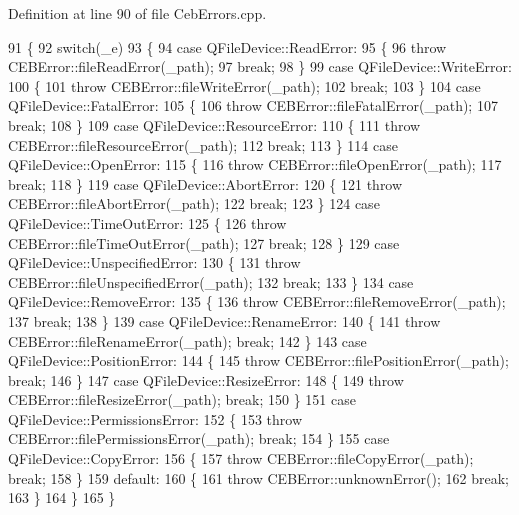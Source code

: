 Definition at line 90 of file Ceb\-Errors.\-cpp.


\begin{DoxyCode}
91 \{
92   \textcolor{keywordflow}{switch}(\_e)
93   \{
94     \textcolor{keywordflow}{case} QFileDevice::ReadError:
95     \{
96       \textcolor{keywordflow}{throw} CEBError::fileReadError(\_path);
97       \textcolor{keywordflow}{break};
98     \}
99     \textcolor{keywordflow}{case} QFileDevice::WriteError:
100     \{
101       \textcolor{keywordflow}{throw} CEBError::fileWriteError(\_path);
102       \textcolor{keywordflow}{break};
103     \}
104     \textcolor{keywordflow}{case} QFileDevice::FatalError:
105     \{
106       \textcolor{keywordflow}{throw} CEBError::fileFatalError(\_path);
107       \textcolor{keywordflow}{break};
108     \}
109     \textcolor{keywordflow}{case} QFileDevice::ResourceError:
110     \{
111       \textcolor{keywordflow}{throw} CEBError::fileResourceError(\_path);
112       \textcolor{keywordflow}{break};
113     \}
114     \textcolor{keywordflow}{case} QFileDevice::OpenError:
115     \{
116       \textcolor{keywordflow}{throw} CEBError::fileOpenError(\_path);
117       \textcolor{keywordflow}{break};
118     \}
119     \textcolor{keywordflow}{case} QFileDevice::AbortError:
120     \{
121       \textcolor{keywordflow}{throw} CEBError::fileAbortError(\_path);
122       \textcolor{keywordflow}{break};
123     \}
124     \textcolor{keywordflow}{case} QFileDevice::TimeOutError:
125     \{
126       \textcolor{keywordflow}{throw} CEBError::fileTimeOutError(\_path);
127       \textcolor{keywordflow}{break};
128     \}
129     \textcolor{keywordflow}{case} QFileDevice::UnspecifiedError:
130     \{
131       \textcolor{keywordflow}{throw} CEBError::fileUnspecifiedError(\_path);
132       \textcolor{keywordflow}{break};
133     \}
134     \textcolor{keywordflow}{case} QFileDevice::RemoveError:
135     \{
136       \textcolor{keywordflow}{throw} CEBError::fileRemoveError(\_path);
137       \textcolor{keywordflow}{break};
138     \}
139     \textcolor{keywordflow}{case} QFileDevice::RenameError:
140     \{
141       \textcolor{keywordflow}{throw} CEBError::fileRenameError(\_path); \textcolor{keywordflow}{break};
142     \}
143     \textcolor{keywordflow}{case} QFileDevice::PositionError:
144     \{
145       \textcolor{keywordflow}{throw} CEBError::filePositionError(\_path); \textcolor{keywordflow}{break};
146     \}
147     \textcolor{keywordflow}{case} QFileDevice::ResizeError:
148     \{
149       \textcolor{keywordflow}{throw} CEBError::fileResizeError(\_path); \textcolor{keywordflow}{break};
150     \}
151     \textcolor{keywordflow}{case} QFileDevice::PermissionsError:
152     \{
153       \textcolor{keywordflow}{throw} CEBError::filePermissionsError(\_path); \textcolor{keywordflow}{break};
154     \}
155     \textcolor{keywordflow}{case} QFileDevice::CopyError:
156     \{
157       \textcolor{keywordflow}{throw} CEBError::fileCopyError(\_path); \textcolor{keywordflow}{break};
158     \}
159     \textcolor{keywordflow}{default}:
160     \{
161       \textcolor{keywordflow}{throw} CEBError::unknownError();
162       \textcolor{keywordflow}{break};
163     \}
164   \}
165 \}
\end{DoxyCode}


